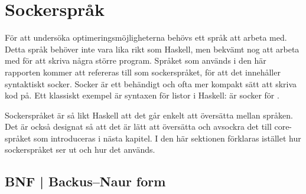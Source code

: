 \documentclass[Rapport]{subfiles}
\begin{document}
\section{Sockerspråk}

%
%
%
%
%
%
%

%





\overviewSugar

För att undersöka optimeringsmöjligheterna behövs ett språk att arbeta med. 
Detta språk behöver inte vara lika rikt som Haskell, men bekvämt nog
att arbeta med för att skriva några större program. Språket som används i den
här rapporten kommer att refereras till som sockerspråket, för att det 
innehåller syntaktiskt socker. Socker är ett behändigt och ofta mer kompakt sätt 
att skriva kod på. Ett klassiskt exempel är syntaxen
för listor i Haskell: \miniCode{[5,0,4]} är socker för .

Sockerspråket är så likt Haskell att det går enkelt att översätta mellan språken.
Det är också designat så att det är lätt att översätta och avsockra det till 
core-språket som introduceras i nästa kapitel. I den här sektionen
förklaras istället hur sockerspråket ser ut och hur det används.

\subsection{BNF | Backus–Naur form}
\end{document}
